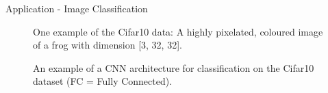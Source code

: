 \begin{vbframe}{Application - Image Classification}
\begin{figure}
        \caption{One example of the Cifar10 data: A highly pixelated, coloured image of a frog with dimension [3, 32, 32]. }
    \end{figure}
\framebreak
    \begin{figure}
        \centering
        \caption{An example of a CNN architecture for classification on the Cifar10 dataset (FC = Fully Connected). }
    \end{figure}  
\end{vbframe}

